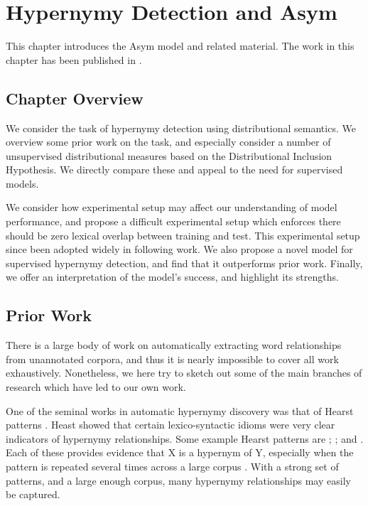 \chapter{Hypernymy Detection and Asym}
\label{ch:lexmem}

This chapter introduces the Asym model and related material. The work
in this chapter has been published in .

\section{Chapter Overview}

We consider the task of hypernymy detection using distributional semantics.
We overview some prior work on the task, and especially consider a number
of unsupervised distributional measures based on the Distributional Inclusion
Hypothesis. We directly compare these and appeal to the need for supervised
models.

We consider how experimental setup may affect our understanding of model
performance, and propose a difficult experimental setup which enforces
there should be zero lexical overlap between training and test. This
experimental setup since been adopted widely in following work.
We also propose a novel model for supervised hypernymy detection, and find
that it outperforms prior work. Finally, we offer an interpretation of the
model's success, and highlight its strengths.

\section{Prior Work}

There is a large body of work on automatically extracting word relationships
from unannotated corpora, and thus it is nearly impossible to cover all work
exhaustively. Nonetheless, we here try to sketch out some of the main branches
of research which have led to our own work.

One of the seminal works in automatic hypernymy discovery was that of Hearst
patterns \cite{hearst:1992:coling}. Heast showed that certain lexico-syntactic
idioms were very clear indicators of hypernymy relationships. Some example
Hearst patterns are ; ;
and . Each of these provides evidence that X is a
hypernym of Y, especially when the pattern is repeated several times across a
large corpus \cite{hearst:1992:coling}. With a strong set of patterns, and a
large enough corpus, many hypernymy relationships may easily be captured. 

